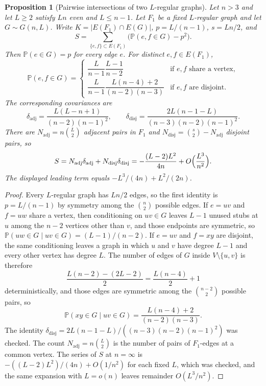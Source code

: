 \documentclass[11pt]{article}
\newtheorem{proposition}[theorem]{Proposition}
\newcommand{\PP}{\mathbb{P}}
\begin{document}
\begin{proposition}[Pairwise intersections of two \(L\)-regular graphs]
\label{prop:pairwise-mass}
Let \(n>3\) and let \(L\ge 2\) satisfy \(Ln\) even and \(L\le n-1\). Let \(F_1\) be a fixed \(L\)-regular graph and let \(G\sim G(n,L)\). Write \(K=|E(F_1)\cap E(G)|\), \(p=L/(n-1)\), \(s=Ln/2\), and
\[
S=\sum_{\{e,f\}\subset E(F_1)}\bigl(\PP(e,f\in G)-p^2\bigr).
\]
Then \(\PP(e\in G)=p\) for every edge \(e\). For distinct \(e,f\in E(F_1)\),
\[
\PP(e,f\in G)
=
\begin{cases}
\dfrac{L}{n-1}\dfrac{L-1}{n-2} & \text{if \(e,f\) share a vertex},\\[1.1em]
\dfrac{L}{n-1}\dfrac{L(n-4)+2}{(n-2)(n-3)} & \text{if \(e,f\) are disjoint}.
\end{cases}
\]
The corresponding covariances are
\[
\delta_{\mathrm{adj}}=\frac{L(L-n+1)}{(n-2)(n-1)^2},\qquad
\delta_{\mathrm{disj}}=\frac{2L(n-1-L)}{(n-3)(n-2)(n-1)^2}.
\]
There are \(N_{\mathrm{adj}}=n\binom{L}{2}\) adjacent pairs in \(F_1\) and \(N_{\mathrm{disj}}=\binom{s}{2}-N_{\mathrm{adj}}\) disjoint pairs, so
\[
S=N_{\mathrm{adj}}\delta_{\mathrm{adj}}+N_{\mathrm{disj}}\delta_{\mathrm{disj}}=-\frac{(L-2)L^2}{4n}+O\Bigl(\frac{L^3}{n^2}\Bigr).
\]
The displayed leading term equals \(-L^3/(4n)+L^2/(2n)\).
\end{proposition}

\begin{proof}
Every \(L\)-regular graph has \(Ln/2\) edges, so the first identity is \(p=L/(n-1)\) by symmetry among the \(\binom{n}{2}\) possible edges.
If \(e=uv\) and \(f=uw\) share a vertex, then conditioning on \(uv\in G\) leaves \(L-1\) unused stubs at \(u\) among the \(n-2\) vertices other than \(v\), and those endpoints are symmetric, so \(\PP(uw\in G\mid uv\in G)=(L-1)/(n-2)\).
If \(e=uv\) and \(f=xy\) are disjoint, the same conditioning leaves a graph in which \(u\) and \(v\) have degree \(L-1\) and every other vertex has degree \(L\).
The number of edges of \(G\) inside \(V\setminus\{u,v\}\) is therefore
\[
\frac{L(n-2)-(2L-2)}{2}=\frac{L(n-4)}{2}+1
\]
deterministically, and those edges are symmetric among the \(\binom{n-2}{2}\) possible pairs, so
\[
\PP(xy\in G\mid uv\in G)=\frac{L(n-4)+2}{(n-2)(n-3)}.
\]
The identity \(\delta_{\mathrm{disj}}=2L(n-1-L)/((n-3)(n-2)(n-1)^2)\) was checked.
The count \(N_{\mathrm{adj}}=n\binom{L}{2}\) is the number of pairs of \(F_1\)-edges at a common vertex.
The series of \(S\) at \(n=\infty\) is \(-((L-2)L^2)/(4n)+O(1/n^2)\) for each fixed \(L\), which was checked, and the same expansion with \(L=o(n)\) leaves remainder \(O(L^3/n^2)\).
\end{proof}
\end{document}

